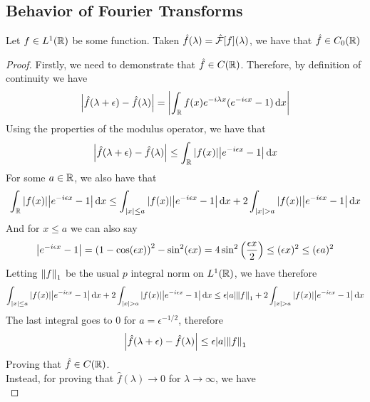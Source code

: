 \documentclass[../complete.tex]{subfiles}
\begin{document}
\subsection{Behavior of Fourier Transforms}
\begin{thm}
	Let $f\in L^1(\R)$ be some function. Taken $\hat{f}(\lambda)=\fou[f](\lambda)$, we have that $\hat{f}\in C_0(\R)$
\end{thm}
\begin{proof}
	Firstly, we need to demonstrate that $\hat{f}\in C(\R)$. Therefore, by definition of continuity we have
	\begin{equation*}
		\abs{\hat{f}(\lambda+\epsilon)-\hat{f}(\lambda)}=\abs{\int_{\R}^{}f(x)e^{-i\lambda x}(e^{-i\epsilon x}-1)\diff x}
	\end{equation*}
	Using the properties of the modulus operator, we have that
	\begin{equation*}
		\abs{\hat{f}(\lambda+\epsilon)-\hat{f}(\lambda)}\le\int_{\R}^{}\abs{f(x)}\abs{e^{-i\epsilon x}-1}\diff x
	\end{equation*}
	For some $a\in\R$, we also have that
	\begin{equation*}
		\int_{\R}^{}\abs{f(x)}\abs{e^{-i\epsilon x}-1}\diff x\le\int_{\abs{x}\le a}^{}\abs{f(x)}\abs{e^{-i\epsilon x}-1}\diff x+2\int_{\abs{x}>a}^{}\abs{f(x)}\abs{e^{-i\epsilon x}-1}\diff x
	\end{equation*}
	And for $x\le a$ we can also say
	\begin{equation*}
		\abs{e^{-i\epsilon x}-1}=\left( 1-\cos(\epsilon x) \right)^2-\sin^2(\epsilon x)=4\sin^2\left( \frac{\epsilon x}{2} \right)\le(\epsilon x)^2\le(\epsilon a)^2
	\end{equation*}
	Letting $\pnorm[1]{f}$ be the usual $p$ integral norm on $L^1(\R)$, we have therefore
	\begin{equation*}
		\int_{\abs{x}\le a}^{}\abs{f(x)}\abs{e^{-i\epsilon x}-1}\diff x+2\int_{\abs{x}>a}^{}\abs{f(x)}\abs{e^{-i\epsilon x}-1}\diff x\le\epsilon\abs{a}\pnorm[1]{f}+2\int_{\abs{x}>a}^{}\abs{f(x)}\abs{e^{-i\epsilon x}-1}\diff x
	\end{equation*}
	The last integral goes to $0$ for $a=\epsilon^{-1/2}$, therefore
	\begin{equation*}
		\abs{\hat{f}(\lambda+\epsilon)-\hat{f}(\lambda)}\le\epsilon\abs{a}\pnorm[1]{f}
	\end{equation*}
	Proving that $\hat{f}\in C(\R)$.\\
	Instead, for proving that $\hat{f}(\lambda)\to0$ for $\lambda\to\infty$, we have
	\begin{equation*}

\end{equation*}
\end{proof}
\end{document}
